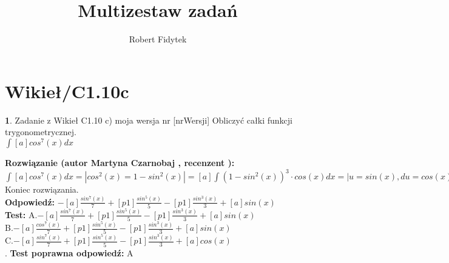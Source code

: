 \documentclass[12pt, a4paper]{article}
\title{Multizestaw zadań}
\author{Robert Fidytek}
\date{}
\theoremstyle{definition} %
\newtheorem{zad}{}
\newcommand{\kategoria}[1]{\section{#1}} %
\newcommand{\zadStart}[1]{\begin{zad}#1\newline} %
\newcommand{\zadStop}{\end{zad}}   %
\newcommand{\rozwStart}[2]{\noindent \textbf{Rozwiązanie (autor #1 , recenzent #2): }\newline} %
\newcommand{\rozwStop}{\newline}                                            %
\newcommand{\odpStart}{\noindent \textbf{Odpowiedź:}\newline}    %
\newcommand{\odpStop}{\newline}                                             %
\newcommand{\testStart}{\noindent \textbf{Test:}\newline} %
\newcommand{\testStop}{\newline} %
\newcommand{\kluczStart}{\noindent \textbf{Test poprawna odpowiedź:}\newline} %
\newcommand{\kluczStop}{\newline} %
\begin{document}
\maketitle


\kategoria{Wikieł/C1.10c}
\zadStart{Zadanie z Wikieł C1.10 c) moja wersja nr [nrWersji]}
Obliczyć całki funkcji trygonometrycznej.\\
$\int [a] cos^{7}(x) dx$\\
\zadStop
\rozwStart{Martyna Czarnobaj}{}
	$\int [a] cos^{7}(x) dx = | cos^{2}(x)=1-sin^{2}(x)| = [a] \int (1-sin^{2}(x))^{3} \cdot cos(x) dx = |u=sin(x), du=cos(x)dx| = [a] \int (1 - u^{2})^{3} du = [a] \int -u^{6} + 3u^{4} - 3u^{2} + 1 du = [a] (- \int u^{6} du + 3 \int u^{4} du - 3 \int u^{2} du + \int 1 du) = -[a]\frac{u^{7}}{7} + [p1]\frac{u^{5}}{5} - [p1]\frac{u^{3}}{3} + [a]u = -[a]\frac{sin^{7}(x)}{7} + [p1]\frac{sin^{5}(x)}{5} - [p1]\frac{sin^{3}(x)}{3} + [a]sin(x)$\\


Koniec rozwiązania.\\
\rozwStop
\odpStart
$ -[a]\frac{sin^{7}(x)}{7} + [p1]\frac{sin^{5}(x)}{5} - [p1]\frac{sin^{3}(x)}{3} + [a]sin(x)$\\
\odpStop
\testStart
A.$-[a]\frac{sin^{7}(x)}{7} + [p1]\frac{sin^{5}(x)}{5} - [p1]\frac{sin^{3}(x)}{3} + [a]sin(x)$\\
B.$-[a]\frac{cos^{7}(x)}{7} + [p1]\frac{sin^{5}(x)}{5} - [p1]\frac{sin^{3}(x)}{3} + [a]sin(x)$\\
C.$-[a]\frac{sin^{7}(x)}{7} + [p1]\frac{sin^{5}(x)}{5} - [p1]\frac{sin^{3}(x)}{3} + [a]cos(x)$\\
.
\testStop
\kluczStart
A
\kluczStop
\end{document}
